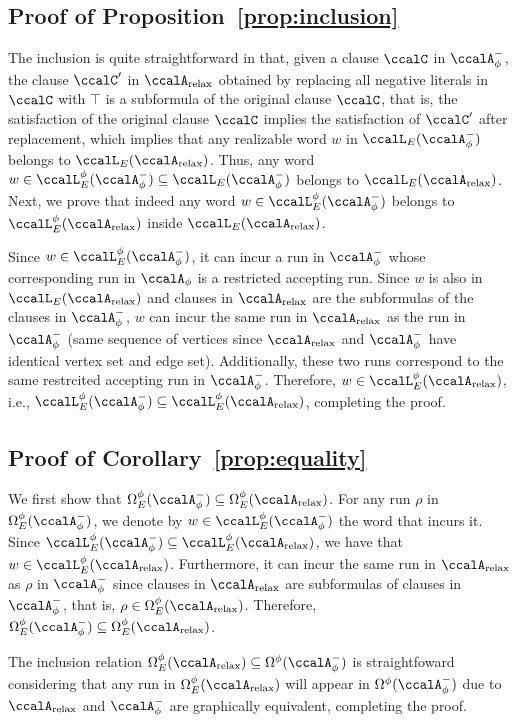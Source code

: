 \documentclass[Afour,sageh,times]{sagej}
\newcommand{\auto}[1]{\ccalA_{\textup{#1}}}
\newcommand{\autop}{\ccalA_{\phi}}
\begin{document}
{\subsection{Proof of Proposition~\ref{prop:inclusion}}\label{app:inclusion}
The inclusion is quite straightforward in that, given a clause $\ccalC$ in $\autop^-$, the clause $\ccalC'$ in $\auto{relax}$ obtained by replacing all negative literals in $\ccalC$ with $\top$ is a subformula of the original clause $\ccalC$, that is, the satisfaction of the original clause $\ccalC$ implies the satisfaction of $\ccalC'$ after replacement, which implies that any realizable word $w$ in $\ccalL_E(\autop^-)$ belongs to $\ccalL_E(\auto{relax})$. Thus, any word $w \in \ccalL^\phi_E(\autop^-)  \subseteq  \ccalL_E(\autop^-)$ belongs to $\ccalL_E(\auto{relax})$. Next, we prove that indeed any word $w \in \ccalL^\phi_E(\autop^-)$ belongs to  $\ccalL^\phi_E(\auto{relax})$ inside $ \ccalL_E(\auto{relax})$.

Since $w \in \ccalL^\phi_E(\autop^-)$, it can incur  a run in $\autop^-$ whose corresponding run in $\autop$ is a restricted accepting run. Since $w$ is also in $\ccalL_E(\auto{relax})$ and clauses in $\auto{relax}$ are the subformulas of the clauses in $\autop^-$, $w$ can incur the same run in $\auto{relax}$ as the run in $\autop^-$ (same sequence of vertices since $\auto{relax}$ and $\autop^-$ have identical vertex set and edge set). Additionally, these two runs correspond to the same restrcited accepting run in $\autop^-$. Therefore, $w \in \ccalL^\phi_E(\auto{relax})$, i.e.,  $\ccalL^\phi_E(\autop^-)\subseteq \ccalL^\phi_E(\auto{relax})$, completing the proof.

\subsection{Proof of Corollary~\ref{prop:equality}} \label{app:equality}
 We first show that  $\Omega_E^\phi(\autop^-) \subseteq  \Omega_E^\phi(\auto{relax})$. For any run $\rho$ in $\Omega_E^\phi(\autop^-)$, we denote by $w  \in  \ccalL^\phi_E(\autop^-)$ the word that incurs it.  Since $\ccalL^\phi_E(\autop^-) \subseteq \ccalL^\phi_E(\auto{relax})$, we have that $w \in\ccalL^\phi_E(\auto{relax})$. Furthermore, it can incur the same run in $\auto{relax}$ as $\rho$  in $\autop^-$ since clauses in $\auto{relax}$ are subformulas of clauses in $\autop^-$, that is, $\rho \in \Omega_E^\phi(\auto{relax}) $. Therefore, $\Omega_E^\phi(\autop^-) \subseteq  \Omega_E^\phi(\auto{relax})$.

   The inclusion relation $\Omega_E^\phi(\auto{relax}) \subseteq \Omega^\phi(\autop^-)$ is straightfoward considering that  any  run in  $\Omega_E^\phi(\auto{relax})$ will appear in $\Omega^\phi(\autop^-)$ due to $\auto{relax}$ and $\autop^-$ are graphically equivalent, completing the proof.

}
\end{document}
